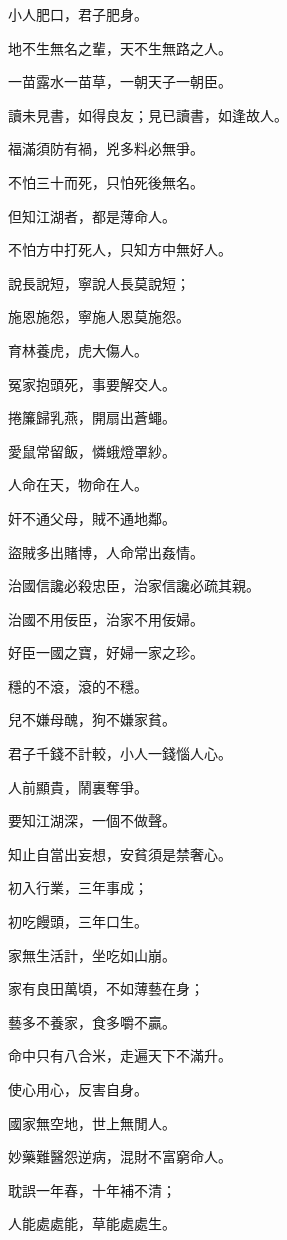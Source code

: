 \documentclass[12pt,a4paper]{ctexbook}
\begin{document}
小人肥口，君子肥身。\par
地不生無名之輩，天不生無路之人。\par
一苗露水一苗草，一朝天子一朝臣。\par
讀未見書，如得良友；見已讀書，如逢故人。\par
福滿須防有禍，兇多料必無爭。\par
不怕三十而死，只怕死後無名。\par
但知江湖者，都是薄命人。\par
不怕方中打死人，只知方中無好人。\par
說長說短，寧說人長莫說短；\par
施恩施怨，寧施人恩莫施怨。\par
育林養虎，虎大傷人。\par
冤家抱頭死，事要解交人。\par
捲簾歸乳燕，開扇出蒼蠅。\par
愛鼠常留飯，憐蛾燈罩紗。\par
人命在天，物命在人。\par
奸不通父母，賊不通地鄰。\par
盜賊多出賭博，人命常出姦情。\par
治國信讒必殺忠臣，治家信讒必疏其親。\par
治國不用佞臣，治家不用佞婦。\par
好臣一國之寶，好婦一家之珍。\par
穩的不滾，滾的不穩。\par
兒不嫌母醜，狗不嫌家貧。\par
君子千錢不計較，小人一錢惱人心。\par
人前顯貴，鬧裏奪爭。\par
要知江湖深，一個不做聲。\par
知止自當出妄想，安貧須是禁奢心。\par
初入行業，三年事成；\par
初吃饅頭，三年口生。\par
家無生活計，坐吃如山崩。\par
家有良田萬頃，不如薄藝在身；\par
藝多不養家，食多嚼不贏。\par
命中只有八合米，走遍天下不滿升。\par
使心用心，反害自身。\par
國家無空地，世上無閒人。\par
妙藥難醫怨逆病，混財不富窮命人。\par
耽誤一年春，十年補不清；\par
人能處處能，草能處處生。\par
\end{document}
